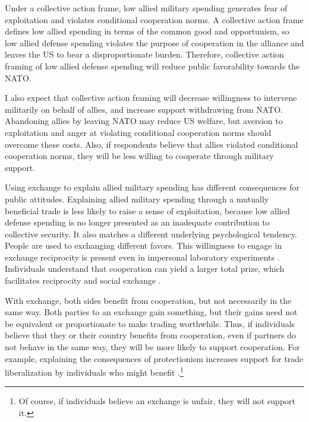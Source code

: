 \documentclass[12pt]{article}
\begin{document}
Under a collective action frame, low allied military spending generates fear of exploitation and violates conditional cooperation norms.
A collective action frame defines low allied spending in terms of the common good and opportunism, so low allied defense spending violates the purpose of cooperation in the alliance and leaves the US to bear a disproportionate burden. 
Therefore, collective action framing of low allied defense spending will reduce public favorability towards the NATO. 


I also expect that collective action framing will decrease willingness to intervene militarily on behalf of allies, and increase support withdrawing from NATO. 
Abandoning allies by leaving NATO may reduce US welfare, but aversion to exploitation and anger at violating conditional cooperation norms should overcome these costs.   
Also, if respondents believe that allies violated conditional cooperation norms, they will be less willing to cooperate through military support. 


Using exchange to explain allied military spending has different consequences for public attitudes. 
Explaining allied military spending through a mutually beneficial trade is less likely to raise a sense of exploitation, because low allied defense spending is no longer presented as an inadequate contribution to collective security. 
It also matches a different underlying psychological tendency. 
People are used to exchanging different favors.
This willingness to engage in exchange reciprocity is present even in impersonal laboratory experiments \citep{McCabeetal1996}. 
Individuals understand that cooperation can yield a larger total prize, which facilitates reciprocity and social exchange \citep{Hoffmanetal1998}. 


With exchange, both sides benefit from cooperation, but not necessarily in the same way. 
Both parties to an exchange gain something, but their gains need not be equivalent or proportionate to make trading worthwhile. 
Thus, if individuals believe that they or their country benefits from cooperation, even if partners do not behave in the same way, they will be more likely to support cooperation. 
For example, explaining the consequences of protectionism increases support for trade liberalization by individuals who might benefit \citep{RhoTomz2017}.\footnote{Of course, if individuals believe an exchange is unfair, they will not support it.}
\end{document}
